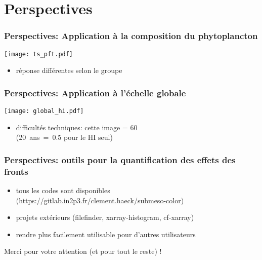 \documentclass[11pt, french, aspectratio=32]{beamer}
\begin{document}
\section{Perspectives}


\begin{frame}
  \frametitle{Perspectives: Application à la composition du phytoplancton}

  \texttt{[image: ts\_pft.pdf]}

  \begin{itemize}
    \item réponse différentes selon le groupe
  \end{itemize}
\end{frame}


\begin{frame}
  \frametitle{Perspectives: Application à l'échelle globale}

  \texttt{[image: global\_hi.pdf]}

  \begin{itemize}
    \item difficultés techniques: cette image = \qty{60}{\MO}
          \\{\small(\mbox{20 ans = \qty{0.5}{\TO}} pour le HI seul)}
  \end{itemize}

\end{frame}


\begin{frame}
  \frametitle{Perspectives: outils pour la quantification des effets des fronts}

  \vfill
  \begin{block}{}
    \begin{itemize}
            \setlength{\itemsep}{1em}
      \item tous les codes sont disponibles {\scriptsize (\url{https://gitlab.in2p3.fr/clement.haeck/submeso-color})}
      \item projets extérieurs (filefinder, xarray-histogram, cf-xarray)
      \item rendre plus facilement utilisable pour d'autres utilisateurs
    \end{itemize}
  \end{block}
  \vfill

\end{frame}

\begin{frame}
  Merci pour votre attention (et pour tout le reste) !
\end{frame}

\appendix
\end{document}

